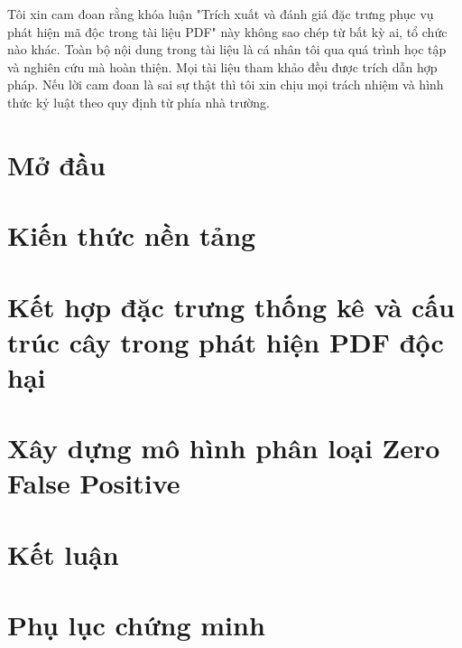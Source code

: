 \documentclass[12pt,a4paper]{report}
\begin{document}
Tôi xin cam đoan rằng khóa luận "Trích xuất và đánh giá đặc trưng phục vụ phát hiện mã độc trong tài liệu PDF" này không sao chép từ bất kỳ ai,
tổ chức nào khác. Toàn bộ nội dung trong tài liệu là cá nhân tôi qua quá
trình học tập và nghiên cứu mà hoàn thiện. Mọi tài liệu tham khảo đều được trích dẫn hợp pháp. Nếu lời cam đoan là sai sự thật thì tôi xin chịu mọi trách nhiệm và
hình thức kỷ luật theo quy định từ phía nhà trường.

\tableofcontents{}
\clearpage{}

\listoffigures{}

\listoftables{}

\clearpage{}
\printglossaries[title=Danh sách thuật ngữ]
\clearpage

\chapter*{Mở đầu}



\chapter{Kiến thức nền tảng}



\chapter{Kết hợp đặc trưng thống kê và cấu trúc cây trong phát hiện PDF độc hại}



\chapter{Xây dựng mô hình phân loại Zero False Positive}




\chapter{Kết luận}



\appendix
\chapter{Phụ lục chứng minh}




\nocite{*}

\printbibliography[heading=bibintoc, title=Tài liệu tham khảo]

\end{document}
